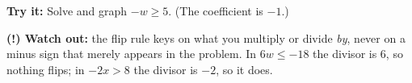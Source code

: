 \documentclass[12pt]{article}
\begin{document}
\begin{tryitbox}
\textbf{Try it:} Solve and graph $-w \ge 5$. (The coefficient is $-1$.)\\[2pt]
\end{tryitbox}

\begin{watchoutbox}
\textbf{(!) Watch out:} the flip rule keys on what you multiply or divide
\emph{by}, never on a minus sign that merely appears in the problem. In
$6w \le -18$ the divisor is $6$, so nothing flips; in $-2x > 8$ the divisor is
$-2$, so it does.
\end{watchoutbox}
\end{document}
